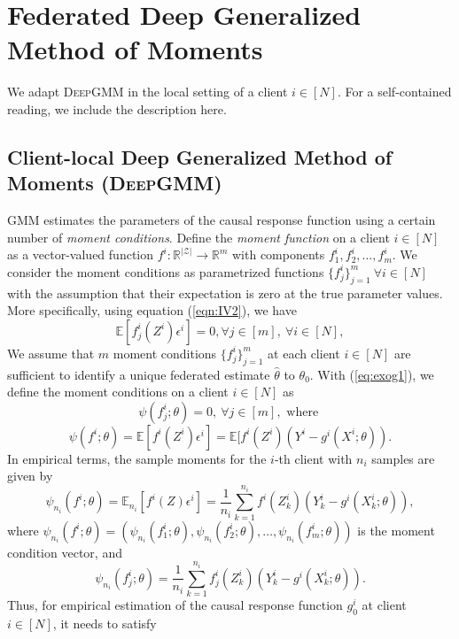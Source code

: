 \documentclass{article}
\let\cite\relax
\newcommand*{\cite}{\citep}
\def\gZ{{\mathcal{Z}}}
\newcommand{\E}{\mathbb{E}}
\newcommand{\dgmm}{\textsc{DeepGMM}\xspace}
\theoremstyle{definition}
\begin{document}
\section{Federated Deep Generalized Method of Moments}
\label{sec:desc}		
We adapt \dgmm \cite{bennett2019deep} in the local setting of a client $i\in[N]$. For a self-contained reading, we include the description here.
\subsection{Client-local Deep Generalized Method of Moments (\dgmm)}
\label{sec:dgmm}
GMM estimates the parameters of the causal response function using a certain number of \textit{moment conditions}. Define the \textit{moment function} on a client $i\in[N]$ as a vector-valued function $f^i:\mathbb{R}^{|\gZ|}\rightarrow\mathbb{R}^{m}$ with components $f_1^i,f_2^i,\dots, f_m^i$. We consider the moment conditions as parametrized functions $\{f_j^i\}_{j=1}^m~\forall i\in[N]$ with the assumption that their expectation is zero at the true parameter values. More specifically, using equation (\ref{eqn:IV2}), we have 
\begin{equation}\label{eq:exog1}
	\E[f_j^i(Z^i)\epsilon^i] = 0, \forall j \in [m],~\forall i\in[N], 
\end{equation}
We assume that $m$ moment conditions $\{f_j^i\}_{j=1}^m$ at each client $i\in[N]$ are sufficient to identify a unique federated estimate $\hat{\theta}$ to $\theta_0$. With (\ref{eq:exog1}), we define the moment conditions on a client $i\in[N]$ as 
\begin{equation}\label{eq:exog2}
	\psi(f^i_j;\theta)=0,~\forall j\in[m],\text{ where }
\end{equation} 
\[
\psi(f^i;\theta)=\mathbb{E}[f^i(Z^i)\epsilon^i]=\mathbb{E}[f^i(Z^i)(Y^i-g^i(X^i;\theta)).
\]
In empirical terms, the sample moments for the $i$-th client with $n_i$ samples are given by
\begin{equation}
	\psi_{n_i}(f^i;\theta)=\mathbb{E}_{n_i}[f^{i}(Z)\epsilon ^i]=\frac{1}{n_i}\sum_{k=1}^{n_i}f^i(Z_k^i)(Y^i_k-g^i(X_k^i;\theta)),
\end{equation}
where $\psi_{n_i}(f^i;\theta)=\left(\psi_{n_i}(f^i_1;\theta),\psi_{n_i}(f^i_2;\theta),\ldots, \psi_{n_i}(f^i_m;\theta)\right)$ is the moment condition vector, and 
\begin{equation}
	\psi_{n_i}(f^i_j;\theta)=\frac{1}{n_i}\sum_{k=1}^{n_i}f^i_j(Z_k^i)(Y^i_k-g^i(X_k^i;\theta)).
\end{equation}
Thus, for empirical estimation of the causal response function $g_0^i$ at client $i\in[N]$, it needs to satisfy 
\end{document}
